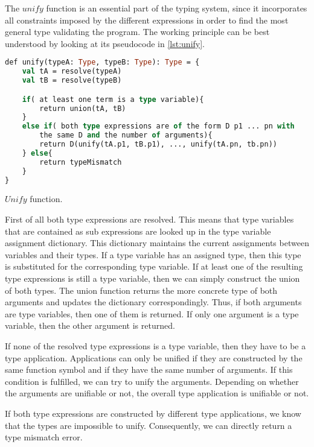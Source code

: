 The $unify$ function is an essential part of the typing system, since it incorporates all constraints imposed by the different expressions in order to find the most general type validating the program.
The working principle can be best understood by looking at its pseudocode in \cref{lst:unify}.
\begin{listing}[!h]
	\begin{CenteredBox}
		\begin{lstlisting}[language=ML,
		commentstyle=\color{black},
		  stringstyle=\color{black},
		  keywordstyle=\color{black}\bfseries,
		  morekeywords={def, return},
		  deletekeywords={type, of, with, and}
		]
def unify(typeA: Type, typeB: Type): Type = {
	val tA = resolve(typeA)
	val tB = resolve(typeB)

	if( at least one term is a type variable){
		return union(tA, tB)
	}
    else if( both type expressions are of the form D p1 ... pn with 
		the same D and the number of arguments){
		return D(unify(tA.p1, tB.p1), ..., unify(tA.pn, tb.pn))
	} else{
		return typeMismatch
	}
}
		\end{lstlisting}
	\end{CenteredBox}
	\caption{$Unify$ function.}
	\label{lst:unify}
\end{listing}

First of all both type expressions are resolved.
This means that type variables that are contained as sub expressions are looked up in the type variable assignment dictionary.
This dictionary maintains the current assignments between variables and their types.
If a type variable has an assigned type, then this type is substituted for the corresponding type variable.
If at least one of the resulting type expressions is still a type variable, then we can simply construct the union of both types.
The union function returns the more concrete type of both arguments and updates the dictionary correspondingly.
Thus, if both arguments are type variables, then one of them is returned.
If only one argument is a type variable, then the other argument is returned.

If none of the resolved type expressions is a type variable, then they have to be a type application.
Applications can only be unified if they are constructed by the same function symbol and if they have the same number of arguments.
If this condition is fulfilled, we can try to unify the arguments.
Depending on whether the arguments are unifiable or not, the overall type application is unifiable or not.

If both type expressions are constructed by different type applications, we know that the types are impossible to unify.
Consequently, we can directly return a type mismatch error.

